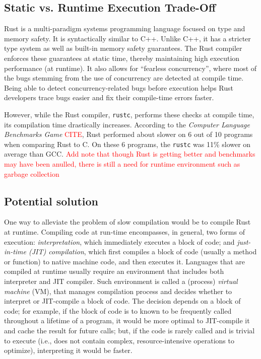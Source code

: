 
\subsection{Static vs. Runtime Execution Trade-Off}
Rust is a multi-paradigm systems programming language focused on type and memory safety.
It is syntactically similar to C++. Unlike C++, it has a stricter type system
as well as built-in memory safety guarantees. The Rust compiler
enforces these guarantees at static time, thereby maintaining high execution
performance (at runtime). It also allows for ``fearless concurrency'', where most of the
bugs stemming from the use of concurrency are detected at compile time. Being able to
detect concurrency-related bugs before execution helps Rust developers
trace bugs easier and fix their compile-time errors faster.


However, while the Rust compiler, \texttt{rustc}, performs these checks at
compile time, its compilation time drastically increases. According to the
\textit{Computer Language Benchmarks Game} \textcolor{red}{CITE}, Rust
performed about slower on 6 out of 10 programs when comparing Rust to C. On
these 6 programs, the \texttt{rustc} was 11\% slower on average than GCC. \textcolor{red}{Add note
that though Rust is getting better and benchmarks may have been anulled, there is
still a need for runtime environment such as garbage collection}

\subsection{Potential solution}

One way to alleviate the problem of slow compilation would be to compile
Rust at runtime. Compiling code at run-time encompasses, in general, two forms
of execution: \textit{interpretation}, which immediately executes a block of code;
and \textit{just-in-time (JIT) compilation}, which first compiles a block of code
(usually a method or function) to native machine code, and then executes it.
Languages that are compiled at runtime usually require an environment
that includes both interpreter and JIT compiler. Such environment is
called a (process) \textit{virtual machine} (VM), that manages
compilation process and decides whether to interpret or JIT-compile
a block of code. The decision depends on a block of code; 
for example, if the block of code is to known to be
frequently called throughout a lifetime of a program, it would be more
optimal to JIT-compile it and cache the result for future calls; but,
if the code is rarely called and is trivial to execute (i.e., does not
contain complex, resource-intensive operations to optimize), interpreting it
would be faster.

